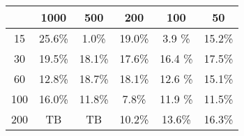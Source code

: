 \documentclass{article}
\begin{document}
\begin{center}
        \begin{tabular}{|c||c|c|c|c|c|}
            \hline
            & 1000 & 500 & 200 & 100 & 50 \\
            \hline\hline
            15 & 25.6\% & 1.0\% & 19.0\% & 3.9 \% & 15.2\% \\
            \hline
            30 & 19.5\% & 18.1\% & 17.6\% & 16.4 \% & 17.5\% \\
            \hline
            60 & 12.8\% & 18.7\% & 18.1\% & 12.6 \% & 15.1\% \\
            \hline
            100 & 16.0\% & 11.8\% & 7.8\% & 11.9 \% & 11.5\% \\
            \hline
            200 & TB & TB & 10.2\% & 13.6\% & 16.3\% \\
            \hline
        \end{tabular}

    \end{center}
    \begin{center}
    \end{center}
\end{document}

